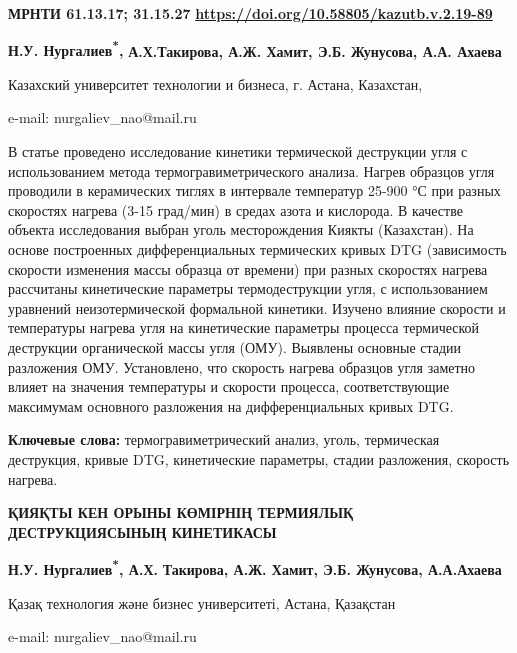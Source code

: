 \clearpage
{\bfseries МРНТИ 61.13.17; 31.15.27}\hfill
\hfill {\bfseries \href{https://doi.org/10.58805/kazutb.v.2.19-89}{https://doi.org/10.58805/kazutb.v.2.19-89}}


\begin{center}
{\bfseries Н.У. Нургалиев\textsuperscript{*},} {\bfseries А.Х.Такирова, А.Ж.
Хамит, Э.Б. Жунусова, А.А. Ахаева}

Казахский университет технологии и бизнеса, г. Астана, Казахстан,

e-mail: nurgaliev\_nao@mail.ru
\end{center}

\hspace{1.5em} В статье проведено исследование кинетики термической деструкции угля с
использованием метода термогравиметрического анализа. Нагрев образцов
угля проводили в керамических тиглях в интервале температур 25-900 °С
при разных скоростях нагрева (3-15 град/мин) в средах азота и кислорода.
В качестве объекта исследования выбран уголь месторождения Киякты
(Казахстан). На основе построенных дифференциальных термических кривых
DTG (зависимость скорости изменения массы образца от времени) при разных
скоростях нагрева рассчитаны кинетические параметры термодеструкции
угля, с использованием уравнений неизотермической формальной кинетики.
Изучено влияние скорости и температуры нагрева угля на кинетические
параметры процесса термической деструкции органической массы угля (ОМУ).
Выявлены основные стадии разложения ОМУ. Установлено, что скорость
нагрева образцов угля заметно влияет на значения температуры и скорости
процесса, соответствующие максимумам основного разложения на
дифференциальных кривых DTG.

\hspace{1.5em} {\bfseries Ключевые слова:} термогравиметрический анализ, уголь,
термическая деструкция, кривые DTG, кинетические параметры, стадии
разложения, скорость нагрева.

\begin{center}
{\large\bfseries ҚИЯҚТЫ КЕН ОРЫНЫ КӨМІРНІҢ ТЕРМИЯЛЫҚ ДЕСТРУКЦИЯСЫНЫҢ КИНЕТИКАСЫ}

\vspace{1em}
{\bfseries Н.У. Нургалиев\textsuperscript{*}, А.Х.} {\bfseries Такирова, А.Ж.
Хамит, Э.Б. Жунусова, А.А.Ахаева}

Қазақ технология және бизнес университеті, Астана, Қазақстан

e-mail: nurgaliev\_nao@mail.ru
\end{center}

